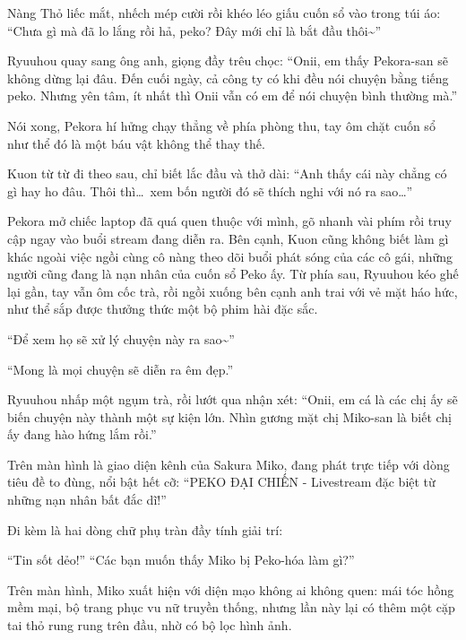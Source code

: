 \documentclass[../main.tex]{subfiles}
\begin{document}
Nàng Thỏ liếc mắt, nhếch mép cười rồi khéo léo giấu cuốn sổ vào trong túi áo: ``Chưa gì mà đã lo lắng rồi hả, peko? Đây mới chỉ là bắt đầu thôi\~{}''

Ryuuhou quay sang ông anh, giọng đầy trêu chọc: ``Onii, em thấy Pekora-san sẽ không dừng lại đâu. Đến cuối ngày, cả công ty có khi đều nói chuyện bằng tiếng peko. Nhưng yên tâm, ít nhất thì Onii vẫn có em để nói chuyện bình thường mà.''

Nói xong, Pekora hí hửng chạy thẳng về phía phòng thu, tay ôm chặt cuốn sổ như thể đó là một báu vật không thể thay thế.

Kuon từ từ đi theo sau, chỉ biết lắc đầu và thở dài: ``Anh thấy cái này chẳng có gì hay ho đâu. Thôi thì\dots\ xem bốn người đó sẽ thích nghi với nó ra sao\dots''

\ct

Pekora mở chiếc laptop đã quá quen thuộc với mình, gõ nhanh vài phím rồi truy cập ngay vào buổi stream đang diễn ra. Bên cạnh, Kuon cũng không biết làm gì khác ngoài việc ngồi cùng cô nàng theo dõi buổi phát sóng của các cô gái, những người cũng đang là nạn nhân của cuốn sổ Peko ấy. Từ phía sau, Ryuuhou kéo ghế lại gần, tay vẫn ôm cốc trà, rồi ngồi xuống bên cạnh anh trai với vẻ mặt háo hức, như thể sắp được thưởng thức một bộ phim hài đặc sắc.

``Để xem họ sẽ xử lý chuyện này ra sao\~{}''

``Mong là mọi chuyện sẽ diễn ra êm đẹp.''

Ryuuhou nhấp một ngụm trà, rồi lướt qua nhận xét: ``Onii, em cá là các chị ấy sẽ biến chuyện này thành một sự kiện lớn. Nhìn gương mặt chị Miko-san là biết chị ấy đang hào hứng lắm rồi.''

Trên màn hình là giao diện kênh của Sakura Miko, đang phát trực tiếp với dòng tiêu đề to đùng, nổi bật hết cỡ: ``PEKO ĐẠI CHIẾN - Livestream đặc biệt từ những nạn nhân bất đắc dĩ!''

Đi kèm là hai dòng chữ phụ tràn đầy tính giải trí:

\begin{center}
  ``Tin sốt dẻo!''
  ``Các bạn muốn thấy Miko bị Peko-hóa làm gì?''
\end{center}

Trên màn hình, Miko xuất hiện với diện mạo không ai không quen: mái tóc hồng mềm mại, bộ trang phục vu nữ truyền thống, nhưng lần này lại có thêm một cặp tai thỏ rung rung trên đầu, nhờ có bộ lọc hình ảnh.

\end{document}
